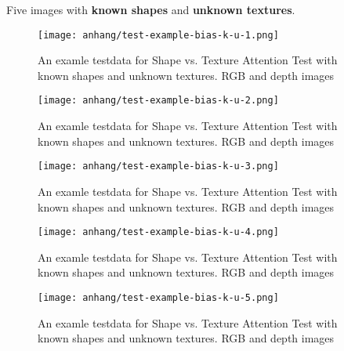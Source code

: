 	\FloatBarrier

	Five images with \textbf{known shapes} and \textbf{unknown textures}.
	
	\begin{figure}[H]
		\centering
		\texttt{[image: anhang/test-example-bias-k-u-1.png]}
		\caption[An examle testdata for Shape vs. Texture Attention Test with known shapes and unknown textures. RGB and depth images]{An examle testdata for Shape vs. Texture Attention Test with known shapes and unknown textures. RGB and depth images}
	\end{figure}
	\begin{figure}[H]
		\centering
		\texttt{[image: anhang/test-example-bias-k-u-2.png]}
		\caption[An examle testdata for Shape vs. Texture Attention Test with known shapes and unknown textures. RGB and depth images]{An examle testdata for Shape vs. Texture Attention Test with known shapes and unknown textures. RGB and depth images}
	\end{figure}
	\begin{figure}[H]
		\centering
		\texttt{[image: anhang/test-example-bias-k-u-3.png]}
		\caption[An examle testdata for Shape vs. Texture Attention Test with known shapes and unknown textures. RGB and depth images]{An examle testdata for Shape vs. Texture Attention Test with known shapes and unknown textures. RGB and depth images}
	\end{figure}
	\begin{figure}[H]
		\centering
		\texttt{[image: anhang/test-example-bias-k-u-4.png]}
		\caption[An examle testdata for Shape vs. Texture Attention Test with known shapes and unknown textures. RGB and depth images]{An examle testdata for Shape vs. Texture Attention Test with known shapes and unknown textures. RGB and depth images}
	\end{figure}
	\begin{figure}[H]
		\centering
		\texttt{[image: anhang/test-example-bias-k-u-5.png]}
		\caption[An examle testdata for Shape vs. Texture Attention Test with known shapes and unknown textures. RGB and depth images]{An examle testdata for Shape vs. Texture Attention Test with known shapes and unknown textures. RGB and depth images}
	\end{figure}
	
	\FloatBarrier
	
